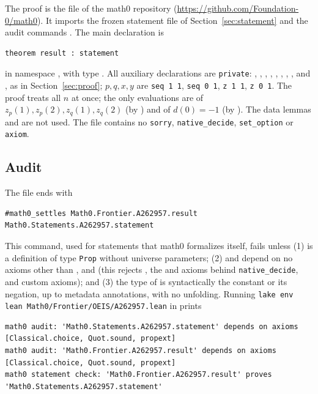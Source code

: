 \documentclass[11pt]{amsart}
\theoremstyle{plain}
\theoremstyle{definition}
\begin{document}
The proof is the file  of the math0 repository (\url{https://github.com/Foundation-0/math0}). It imports the frozen statement file of Section~\ref{sec:statement} and the audit commands . The main declaration is
\begin{lstlisting}
theorem result : statement
\end{lstlisting}
in namespace , with type . All auxiliary declarations are \texttt{private}: , , , , , , , ,  and , as in Section~\ref{sec:proof}; $p,q,x,y$ are \texttt{seq 1 1}, \texttt{seq 0 1}, \texttt{z 1 1}, \texttt{z 0 1}. The proof treats all $n$ at once; the only evaluations are of $z_p(1),z_p(2),z_q(1),z_q(2)$ (by ) and of $d(0)=-1$ (by ). The data lemmas  and  are not used. The file contains no \texttt{sorry}, \texttt{native\_decide}, \texttt{set\_option} or \texttt{axiom}.

\subsection*{Audit}
The file ends with
\begin{lstlisting}
#math0_settles Math0.Frontier.A262957.result Math0.Statements.A262957.statement
\end{lstlisting}
This command, used for statements that math0 formalizes itself, fails unless (1)  is a definition of type \texttt{Prop} without universe parameters; (2)  and  depend on no axioms other than ,  and  (this rejects , the  and  axioms behind \texttt{native\_decide}, and custom axioms); and (3) the type of  is syntactically the constant  or its negation, up to metadata annotations, with no unfolding. Running \texttt{lake env lean Math0/Frontier/OEIS/A262957.lean} in  prints
\begin{lstlisting}[basicstyle=\ttfamily\scriptsize,keywords={}]
math0 audit: 'Math0.Statements.A262957.statement' depends on axioms [Classical.choice, Quot.sound, propext]
math0 audit: 'Math0.Frontier.A262957.result' depends on axioms [Classical.choice, Quot.sound, propext]
math0 statement check: 'Math0.Frontier.A262957.result' proves 'Math0.Statements.A262957.statement'
\end{lstlisting}
\end{document}
